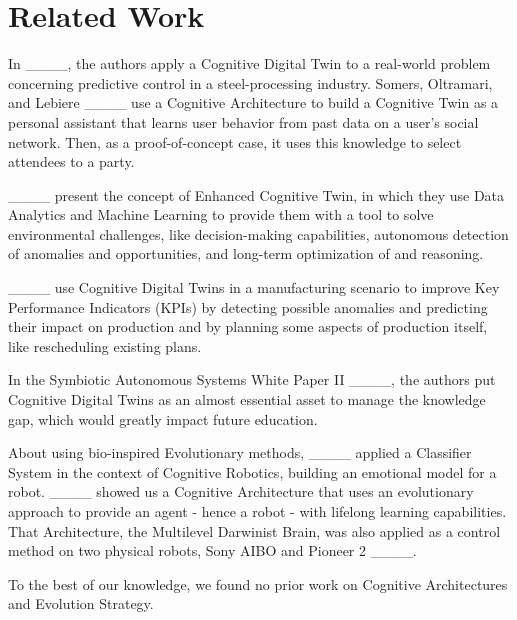 \section{Related Work}
\label{relatedwork}


In ____, the authors apply a Cognitive Digital Twin to a real-world problem concerning predictive control in a steel-processing industry. Somers, Oltramari, and Lebiere ____ use a Cognitive Architecture to build a Cognitive Twin as a personal assistant that learns user behavior from past data on a user's social network. Then, as a proof-of-concept case, it uses this knowledge to select attendees to a party. 

____ present the concept of Enhanced Cognitive Twin, in which they use Data Analytics and Machine Learning to provide them with a tool to solve environmental challenges, like decision-making capabilities, autonomous detection of anomalies and opportunities, and long-term optimization of and reasoning.

____ use Cognitive Digital Twins in a manufacturing scenario to improve Key Performance Indicators (KPIs) by detecting possible anomalies and predicting their impact on production and by planning some aspects of production itself, like rescheduling existing plans.

In the Symbiotic Autonomous Systems White Paper II ____, the authors put Cognitive Digital Twins as an almost essential asset to manage the knowledge gap, which would greatly impact future education.


 About using bio-inspired Evolutionary methods, ____ applied a Classifier System in the context of Cognitive Robotics, building an emotional model for a robot. ____ showed us a Cognitive Architecture that uses an evolutionary approach to provide an agent - hence a robot - with lifelong learning capabilities. That Architecture, the Multilevel Darwinist Brain, was also applied as a control method on two physical robots, Sony AIBO and Pioneer 2 ____.

To the best of our knowledge, we found no prior work on Cognitive Architectures and Evolution Strategy.
